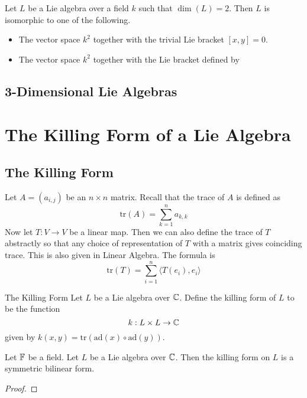 \documentclass[a4paper]{article}
\begin{document}
\begin{prp}{}{} Let $L$ be a Lie algebra over a field $k$ such that $\dim(L)=2$. Then $L$ is isomorphic to one of the following. 
\begin{itemize}
\item The vector space $k^2$ together with the trivial Lie bracket $[x,y]=0$. 
\item The vector space $k^2$ together with the Lie bracket defined by 
\end{itemize}
\end{prp}

\subsection{3-Dimensional Lie Algebras}

\pagebreak
\section{The Killing Form of a Lie Algebra}
\subsection{The Killing Form}
Let $A=(a_{i,j})$ be an $n\times n$ matrix. Recall that the trace of $A$ is defined as $$\text{tr}(A)=\sum_{k=1}^na_{k,k}$$ Now let $T:V\to V$ be a linear map. Then we can also define the trace of $T$ abstractly so that any choice of representation of $T$ with a matrix gives coinciding trace. This is also given in Linear Algebra. The formula is $$\text{tr}(T)=\sum_{i=1}^n\langle T(e_i),e_i\rangle$$

\begin{defn}{The Killing Form}{} Let $L$ be a Lie algebra over $\mathbb{C}$. Define the killing form of $L$ to be the function $$k:L\times L\to\mathbb{C}$$ given by $k(x,y)=\text{tr}(\text{ad}(x)\circ\text{ad}(y))$. 
\end{defn}

\begin{lmm}{}{} Let $\mathbb{F}$ be a field. Let $L$ be a Lie algebra over $\mathbb{C}$. Then the killing form on $L$ is a symmetric bilinear form. \tcbline
\begin{proof}
\end{proof}
\end{lmm}
\end{document}
